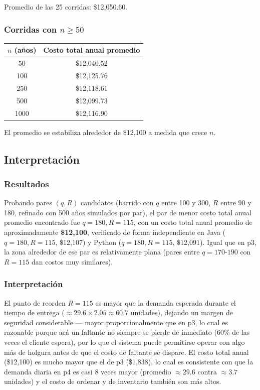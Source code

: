 \documentclass[12pt, a4paper]{article}
\begin{document}
Promedio de las 25 corridas: \$12,050.60.

\subsubsection{\texorpdfstring{Corridas con $n \geq 50$}{Corridas con n mayor igual 50}}

\begin{center}
\begin{tabular}{cc}
\toprule
$n$ (años) & Costo total anual promedio \\
\midrule
50   & \$12,040.52 \\
100  & \$12,125.76 \\
250  & \$12,118.61 \\
500  & \$12,099.73 \\
1000 & \$12,116.90 \\
\bottomrule
\end{tabular}
\end{center}

El promedio se estabiliza alrededor de \$12,100 a medida que crece $n$.

\subsection{Interpretación}

\subsubsection{Resultados}

Probando pares $(q,R)$ candidatos (barrido con $q$ entre 100 y 300, $R$ entre 90 y 180, refinado con 500 años simulados por par), el par de menor costo total anual promedio encontrado fue $q=180, R=115$, con un costo total anual promedio de aproximadamente \textbf{\$12,100}, verificado de forma independiente en Java ($q=180,R=115$, \$12{,}107) y Python ($q=180,R=115$, \$12{,}091). Igual que en p3, la zona alrededor de ese par es relativamente plana (pares entre $q=170$-$190$ con $R=115$ dan costos muy similares).

\subsubsection{Interpretación}

El punto de reorden $R=115$ es mayor que la demanda esperada durante el tiempo de entrega ($\approx 29.6 \times 2.05 \approx 60.7$ unidades), dejando un margen de seguridad considerable — mayor proporcionalmente que en p3, lo cual es razonable porque acá un faltante no siempre se pierde de inmediato (60\% de las veces el cliente espera), por lo que el sistema puede permitirse operar con algo más de holgura antes de que el costo de faltante se dispare. El costo total anual (\$12,100) es mucho mayor que el de p3 (\$1,838), lo cual es consistente con que la demanda diaria en p4 es casi 8 veces mayor (promedio $\approx 29.6$ contra $\approx 3.7$ unidades) y el costo de ordenar y de inventario también son más altos.
\end{document}
